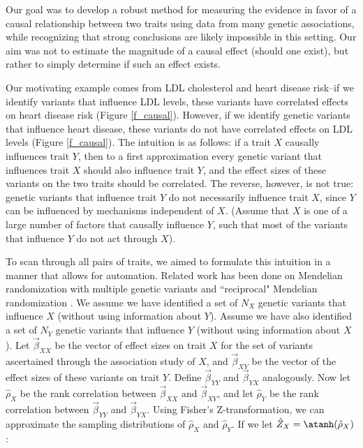 \documentclass[11pt,titlepage]{article}
\begin{document}
Our goal was to develop a robust method for measuring the evidence in favor of a causal relationship between two traits using data from many genetic associations, while recognizing that strong conclusions are likely impossible in this setting. Our aim was not to estimate the magnitude of a causal effect (should one exist), but rather to simply determine if such an effect exists. 

Our motivating example comes from LDL cholesterol and heart disease risk--if we identify variants that influence LDL levels, these variants have correlated effects on heart disease risk (Figure \ref{f_causal}). However, if we identify genetic variants that influence heart disease, these variants do not have correlated effects on LDL levels (Figure \ref{f_causal}). The intuition is as follows: if a trait $X$ causally influences trait $Y$, then to a first approximation every genetic variant that influences trait $X$ should also influence trait $Y$, and the effect sizes of these variants on the two traits should be correlated. The reverse, however, is not true: genetic variants that influence trait $Y$ do not necessarily influence trait $X$, since $Y$ can be influenced by mechanisms independent of $X$. (Assume that $X$ is one of a large number of factors that causally influence $Y$, such that most of the variants that influence $Y$ do not act through $X$).

To scan through all pairs of traits, we aimed to formulate this intuition in a manner that allows for automation. Related work has been done on Mendelian randomization with multiple genetic variants \citep{Do:2013aa, Evans:2013aa, Davey-Smith:2014aa} and ``reciprocal" Mendelian randomization \citep{Timpson:2011aa}. We assume we have identified a set of $N_X$ genetic variants that influence $X$ (without using information about $Y$). Assume we have also identified a set of $N_Y$ genetic variants that influence $Y$ (without using information about $X$). Let $\vec \beta_{XX}$ be the vector of effect sizes on trait $X$ for the set of variants ascertained through the association study of $X$, and  $\vec \beta_{XY}$ be the vector of the effect sizes of these variants on trait $Y$. Define $\vec \beta_{YY}$ and $\vec \beta_{YX}$ analogously. Now let $\hat \rho_X$ be the rank correlation between $\vec \beta_{XX}$ and $\vec \beta_{XY}$,  and let $\hat \rho_Y$ be the rank correlation between $\vec \beta_{YY}$ and $\vec \beta_{YX}$. Using Fisher's Z-transformation, we can approximate the sampling distributions of  $\hat \rho_X$ and $\hat \rho_Y$. If we let $\hat Z_X = \atanh(\hat \rho_X)$:
\end{document}
